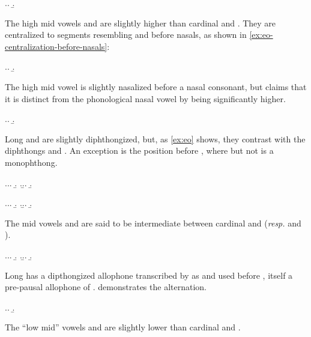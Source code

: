 \ex.\label{feurm}\a.
\b.

The high mid vowels  and  are slightly higher than cardinal \ipa{[e]} and \ipa{[o]}. They are centralized to segments resembling \ipa{[ɪ]} and \ipa{[ʊ]} before nasals, as shown in \cref{ex:eo-centralization-before-nasals}:

\ex.\label{ex:eo-centralization-before-nasals}\a.
\b.

The high mid vowel \ipa{[o]} is slightly nasalized before a nasal consonant, but \citet[p.~118]{humphreys95:_phonol_bothoa_saint_nicol_pelem} claims that it is distinct from the phonological nasal vowel \ipa{[õ]} by being significantly higher.

\ex.\a.
\b.

Long  and  are slightly diphthongized, but, as \cref{ex:eo} shows, they contrast with the diphthongs \ipa{[ɛĭ]} and \ipa{[əŭ]}. An exception is the position before \ipa{[r]}, where \dash but not \dash is a monophthong.

\ex.\label{ex:eo}\a.\a.
\b.
\z.\b.\a.
\b.

\ex.\a.\a.
\b.
\z.\b.\a.
\b.

The mid vowels \ipa{[ɛ]} and \ipa{[ɔ]} are said to be intermediate between cardinal \ipa{[e]} and \ipa{[ɛ]} (\emph{resp.\@} \ipa{[o]} and \ipa{[ɔ]}).

\ex.\a.\a.
\b.
\z.\b.\a.
\b.

Long  has a dipthongized allophone transcribed by \citet{humphreys95:_phonol_bothoa_saint_nicol_pelem} as \ipa{[ɛ\textsuperscript{ə}]} and used before , itself a pre-pausal allophone of \ipa{[h]}.  demonstrates the alternation.

\ex.\label{sech-eo}\a.
\b.


The \enquote{low mid} vowels \ipa{[æ]} and \ipa{[ɒ]} are slightly lower than cardinal \ipa{[ɛ]} and \ipa{[ɔ]}.

